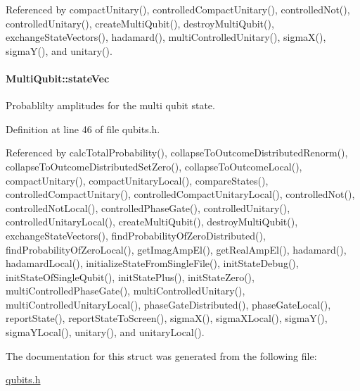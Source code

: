 Referenced by compact\+Unitary(), controlled\+Compact\+Unitary(), controlled\+Not(), controlled\+Unitary(), create\+Multi\+Qubit(), destroy\+Multi\+Qubit(), exchange\+State\+Vectors(), hadamard(), multi\+Controlled\+Unitary(), sigma\+X(), sigma\+Y(), and unitary().

\paragraph[{\texorpdfstring{state\+Vec}{stateVec}}]{ Multi\+Qubit\+::state\+Vec}\hypertarget{structMultiQubit_a45483190d6b01ef6b2f98f2bec9ab94f}{}\label{structMultiQubit_a45483190d6b01ef6b2f98f2bec9ab94f}


Probablilty amplitudes for the multi qubit state. 



Definition at line 46 of file qubits.\+h.



Referenced by calc\+Total\+Probability(), collapse\+To\+Outcome\+Distributed\+Renorm(), collapse\+To\+Outcome\+Distributed\+Set\+Zero(), collapse\+To\+Outcome\+Local(), compact\+Unitary(), compact\+Unitary\+Local(), compare\+States(), controlled\+Compact\+Unitary(), controlled\+Compact\+Unitary\+Local(), controlled\+Not(), controlled\+Not\+Local(), controlled\+Phase\+Gate(), controlled\+Unitary(), controlled\+Unitary\+Local(), create\+Multi\+Qubit(), destroy\+Multi\+Qubit(), exchange\+State\+Vectors(), find\+Probability\+Of\+Zero\+Distributed(), find\+Probability\+Of\+Zero\+Local(), get\+Imag\+Amp\+El(), get\+Real\+Amp\+El(), hadamard(), hadamard\+Local(), initialize\+State\+From\+Single\+File(), init\+State\+Debug(), init\+State\+Of\+Single\+Qubit(), init\+State\+Plus(), init\+State\+Zero(), multi\+Controlled\+Phase\+Gate(), multi\+Controlled\+Unitary(), multi\+Controlled\+Unitary\+Local(), phase\+Gate\+Distributed(), phase\+Gate\+Local(), report\+State(), report\+State\+To\+Screen(), sigma\+X(), sigma\+X\+Local(), sigma\+Y(), sigma\+Y\+Local(), unitary(), and unitary\+Local().



The documentation for this struct was generated from the following file\+:\begin{DoxyCompactItemize}
\item 
\hyperlink{qubits_8h}{qubits.\+h}\end{DoxyCompactItemize}
